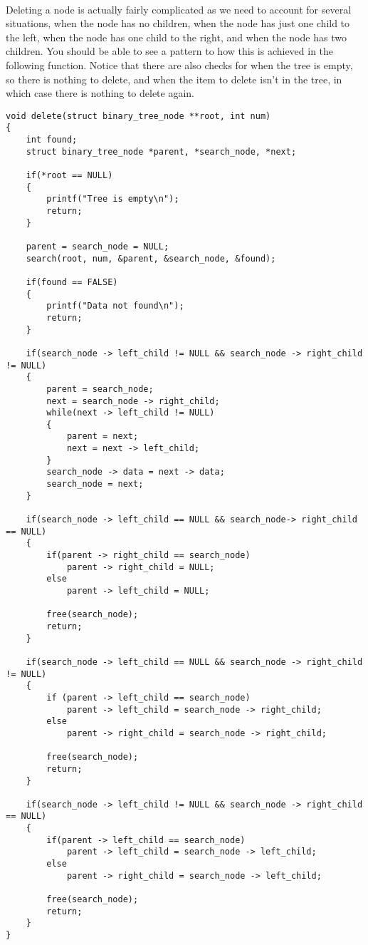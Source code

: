\documentclass[10pt, a4paper, twosize]{article}
\begin{document}
\paragraph{} Deleting a node is actually fairly complicated as we need to account for several situations, when the node has no children, when the node has just one child to the left, when the node has one child to the right, and when the node has two children. You should be able to see a pattern to how this is achieved in the following function. Notice that there are also checks for when the tree is empty, so there is nothing to delete, and when the item to delete isn't in the tree, in which case there is nothing to delete again.
\begin{lstlisting}
void delete(struct binary_tree_node **root, int num)
{
    int found;
    struct binary_tree_node *parent, *search_node, *next;

    if(*root == NULL)
    {
        printf("Tree is empty\n");
        return;
    }

    parent = search_node = NULL;
    search(root, num, &parent, &search_node, &found);

    if(found == FALSE)
    {
        printf("Data not found\n");
        return;
    }

    if(search_node -> left_child != NULL && search_node -> right_child != NULL)
    {
        parent = search_node;
        next = search_node -> right_child;
        while(next -> left_child != NULL)
        {
            parent = next;
            next = next -> left_child;
        }
        search_node -> data = next -> data;
        search_node = next;
    }

    if(search_node -> left_child == NULL && search_node-> right_child == NULL)
    {
        if(parent -> right_child == search_node)
            parent -> right_child = NULL;
        else
            parent -> left_child = NULL;

        free(search_node);
        return;
    }

    if(search_node -> left_child == NULL && search_node -> right_child != NULL)
    {
        if (parent -> left_child == search_node)
            parent -> left_child = search_node -> right_child;
        else
            parent -> right_child = search_node -> right_child;

        free(search_node);
        return;
    }

    if(search_node -> left_child != NULL && search_node -> right_child == NULL)
    {
        if(parent -> left_child == search_node)
            parent -> left_child = search_node -> left_child;
        else
            parent -> right_child = search_node -> left_child;

        free(search_node);
        return;
    }
}
\end{lstlisting}
\end{document}
